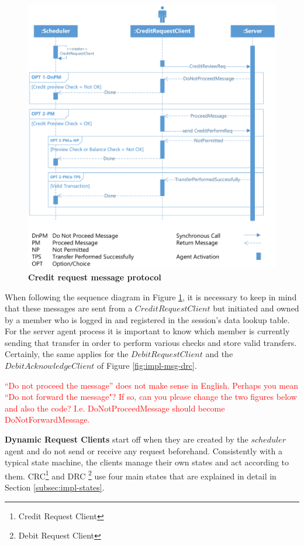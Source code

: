 \begin{figure}[htbp]
  \centering
  \includegraphics[width=1.0\textwidth]{Figures/creditrequest}
  \caption{\bf\small Credit request message protocol}
  \label{fig:impl-msg-crc}
\end{figure}


When following the sequence diagram in Figure \ref{fig:impl-msg-crc}, it is necessary to keep in mind that these messages are sent from a $CreditRequestClient$ but initiated and owned by a member who is logged in and registered in the session's data lookup table. For the server agent process it is important to know which member is currently sending that transfer in order to perform various checks and store valid transfers. Certainly, the same applies for the $DebitRequestClient$ and the $DebitAcknowledgeClient$ of Figure \ref{fig:impl-msg-drc}.

\textcolor{red}{``Do not proceed the message'' does not make sense in English. Perhaps you mean ``Do not forward the message"? If so, can you please change the two figures below and also the code? I.e. DoNotProceedMessage should become DoNotForwardMessage.}



\textbf{Dynamic Request Clients} start off when they are created by the $scheduler$ agent and do not send or receive any request beforehand. Consistently with a typical state machine, the clients manage their own states and act according to them. CRC\footnote{Credit Request Client} and DRC \footnote{Debit Request Client} use four main states that are explained in detail in Section \ref{subsec:impl-states}.

